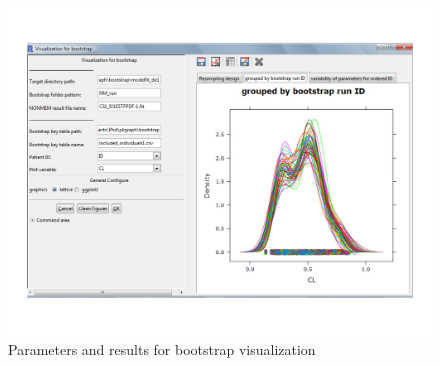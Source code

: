 \documentclass[a4paper]{article}
\begin{document}
\begin{figure}[h!tb] \centering
\includegraphics[scale=0.6]{bootPara.pdf}
\caption{Parameters and results for bootstrap visualization}
\label{bootPara}
\end{figure}
\end{document}
